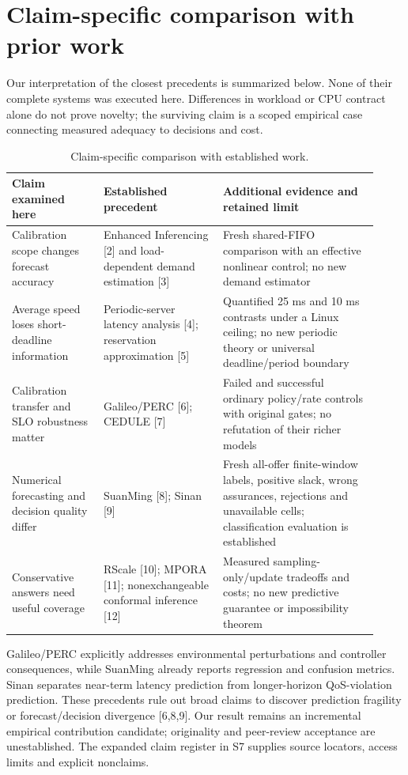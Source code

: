 \documentclass[10pt,a4paper]{article}
\begin{document}
\section{Claim-specific comparison with prior work}

Our interpretation of the closest precedents is summarized below. None of their complete systems was executed here. Differences in workload or CPU contract alone do not prove novelty; the surviving claim is a scoped empirical case connecting measured adequacy to decisions and cost.

\begin{table}[t]
\centering
\caption{Claim-specific comparison with established work.}
\label{tab:novelty}
\small\setlength{\tabcolsep}{3pt}\renewcommand{\arraystretch}{1.12}
\begin{tabular}{>{\raggedright\arraybackslash}p{0.2300\linewidth}>{\raggedright\arraybackslash}p{0.3000\linewidth}>{\raggedright\arraybackslash}p{0.3900\linewidth}}
\toprule
Claim examined here & Established precedent & Additional evidence and retained limit \\
\midrule
Calibration scope changes forecast accuracy & Enhanced Inferencing [2] and load-dependent demand estimation [3] & Fresh shared-FIFO comparison with an effective nonlinear control; no new demand estimator \\
Average speed loses short-deadline information & Periodic-server latency analysis [4]; reservation approximation [5] & Quantified 25 ms and 10 ms contrasts under a Linux ceiling; no new periodic theory or universal deadline/period boundary \\
Calibration transfer and SLO robustness matter & Galileo/PERC [6]; CEDULE [7] & Failed and successful ordinary policy/rate controls with original gates; no refutation of their richer models \\
Numerical forecasting and decision quality differ & SuanMing [8]; Sinan [9] & Fresh all-offer finite-window labels, positive slack, wrong assurances, rejections and unavailable cells; classification evaluation is established \\
Conservative answers need useful coverage & RScale [10]; MPORA [11]; nonexchangeable conformal inference [12] & Measured sampling-only/update tradeoffs and costs; no new predictive guarantee or impossibility theorem \\
\bottomrule
\end{tabular}
\end{table}

Galileo/PERC explicitly addresses environmental perturbations and controller consequences, while SuanMing already reports regression and confusion metrics. Sinan separates near-term latency prediction from longer-horizon QoS-violation prediction. These precedents rule out broad claims to discover prediction fragility or forecast/decision divergence [6,8,9]. Our result remains an incremental empirical contribution candidate; originality and peer-review acceptance are unestablished. The expanded claim register in S7 supplies source locators, access limits and explicit nonclaims.
\end{document}
